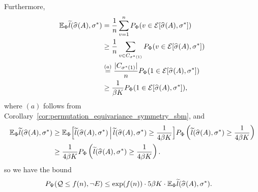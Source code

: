 \documentclass{article}
\begin{document}
Furthermore,
\begin{align*}
 {\mathbb E}_{\Phi}  \widetilde{l}(\widehat{\sigma}(A), \sigma^*) &= 
    \frac{1}{n} \sum_{v=1}^n P_{\Phi}( v \in \mathcal{E}[\widehat{\sigma}(A), \sigma^*]) \\
  &\geq \frac{1}{n} \sum_{v \in C_{\sigma^*(1)}} P_{\Phi}( v \in \mathcal{E}[\widehat{\sigma}(A), \sigma^*]) \\
  &\stackrel{(a)}= \frac{|C_{\sigma^*(1)}|}{n} P_{\Phi}(1 \in \mathcal{E}[\widehat{\sigma}(A), \sigma^*]) \\
  &\geq \frac{1}{ \beta K} P_{\Phi}(1 \in \mathcal{E}[\widehat{\sigma}(A), \sigma^*]),
\end{align*}
where $(a)$ follows from Corollary~\ref{cor:permutation_equivariance_symmetry_sbm}, and
\begin{align*}
{\mathbb E}_{\Phi} \widetilde{l}(\widehat{\sigma}(A), \sigma^*) &\geq  
         {\mathbb E}_{\Phi}\Big[ \widetilde{l}(\widehat{\sigma}(A), \sigma^*) \,\Big|\, 
        \widetilde{l}(\widehat{\sigma}(A), \sigma^*) \geq \frac{1}{4\beta K}\Big] 
              P_\Phi\left( \widetilde{l}(\widehat{\sigma}(A), \sigma^*) \geq \frac{1}{4\beta K} \right) \\
    &\geq \frac{1}{4\beta K} P_\Phi\left( \widetilde{l}(\widehat{\sigma}(A), \sigma^*) \geq \frac{1}{4\beta K} \right).
\end{align*}
so we have the bound
\begin{align*}
P_{\Psi}( \mathcal{Q} \leq f(n), \neg E) &\leq 
     \exp( f(n)) \cdot 5 \beta K \cdot {\mathbb E}_{\Phi} \widetilde{l}(\widehat{\sigma}(A), \sigma^*).
\end{align*}
\end{document}
